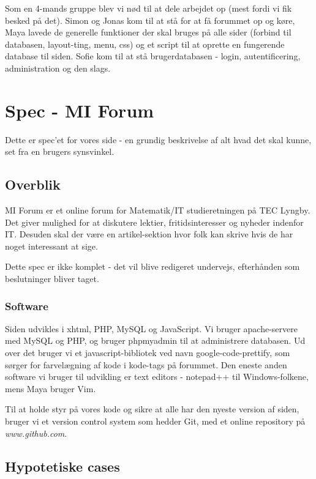 \documentclass{article}
\begin{document}
Som en 4-mands gruppe blev vi nød til at dele arbejdet op (mest fordi vi fik besked på det). Simon og Jonas kom til at stå for at få forummet op og køre, Maya lavede de generelle funktioner der skal bruges på alle sider (forbind til databasen, layout-ting, menu, css) og et script til at oprette en fungerende database til siden. Sofie kom til at stå brugerdatabasen - login, autentificering, administration og den slags.

\section{Spec - MI Forum}

Dette er spec'et for vores side - en grundig beskrivelse af alt hvad det skal kunne, set fra en brugers synsvinkel.

\subsection{Overblik}

MI Forum er et online forum for Matematik/IT studieretningen på TEC Lyngby. Det giver mulighed for at diskutere lektier, fritidsinteresser og nyheder indenfor IT. Desuden skal der være en artikel-sektion hvor folk kan skrive hvis de har noget interessant at sige.

Dette spec er ikke komplet - det vil blive redigeret undervejs, efterhånden som beslutninger bliver taget.

\subsubsection{Software}
Siden udvikles i xhtml, PHP, MySQL og JavaScript. Vi bruger apache-servere med MySQL og PHP, og bruger phpmyadmin til at administrere databasen. Ud over det bruger vi et javascript-bibliotek ved navn google-code-prettify, som sørger for farvelægning af kode i kode-tags på forummet. Den eneste anden software vi bruger til udvikling er text editors - notepad++ til Windows-folkene, mens Maya bruger Vim.

Til at holde styr på vores kode og sikre at alle har den nyeste version af siden, bruger vi et version control system som hedder Git, med et online repository på \emph{www.github.com}.

\subsection{Hypotetiske cases}
\end{document}
